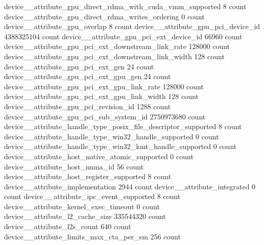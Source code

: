 device__attribute_gpu_direct_rdma_with_cuda_vmm_supported                                      8 count
device__attribute_gpu_direct_rdma_writes_ordering                                              0 count
device__attribute_gpu_overlap                                                                  8 count
device__attribute_gpu_pci_device_id                                                   4388325104 count
device__attribute_gpu_pci_ext_device_id                                                    66960 count
device__attribute_gpu_pci_ext_downstream_link_rate                                        128000 count
device__attribute_gpu_pci_ext_downstream_link_width                                          128 count
device__attribute_gpu_pci_ext_gen                                                             24 count
device__attribute_gpu_pci_ext_gpu_gen                                                         24 count
device__attribute_gpu_pci_ext_gpu_link_rate                                               128000 count
device__attribute_gpu_pci_ext_gpu_link_width                                                 128 count
device__attribute_gpu_pci_revision_id                                                       1288 count
device__attribute_gpu_pci_sub_system_id                                               2750973680 count
device__attribute_handle_type_posix_file_descriptor_supported                                  8 count
device__attribute_handle_type_win32_handle_supported                                           0 count
device__attribute_handle_type_win32_kmt_handle_supported                                       0 count
device__attribute_host_native_atomic_supported                                                 0 count
device__attribute_host_numa_id                                                                56 count
device__attribute_host_register_supported                                                      8 count
device__attribute_implementation                                                            2944 count
device__attribute_integrated                                                                   0 count
device__attribute_ipc_event_supported                                                          8 count
device__attribute_kernel_exec_timeout                                                          0 count
device__attribute_l2_cache_size                                                        335544320 count
device__attribute_l2s_count                                                                  640 count
device__attribute_limits_max_cta_per_sm                                                      256 count
